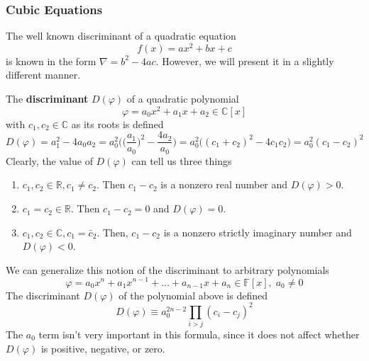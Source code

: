     \subsubsection{Cubic Equations}

      The well known discriminant of a quadratic equation 
      \begin{equation}
        f(x) = ax^2 + bx + c
      \end{equation}
      is known in the form $\nabla = b^2 - 4ac$. However, we will present it in a slightly different manner. 

      \begin{definition}
        The \textbf{discriminant} $D(\varphi)$ of a quadratic polynomial
        \begin{equation}
          \varphi = a_0 x^2 + a_1 x + a_2 \in \mathbb{C}[x]
        \end{equation}
        with $c_1, c_2 \in \mathbb{C}$ as its roots is defined
        \begin{equation}
          D(\varphi) = a_1^2 - 4 a_0 a_2 = a_0^2 \bigg( \Big(\frac{a_1}{a_0} \Big)^2 - \frac{4 a_2}{a_0} \bigg) = a_0^2 \big( (c_1 + c_2)^2 - 4 c_1 c_2 \big) = a_0^2 (c_1 - c_2)^2
        \end{equation}
        Clearly, the value of $D(\varphi)$ can tell us three things
        \begin{enumerate}
          \item $c_1, c_2 \in \mathbb{R}, c_1 \neq c_2$. Then $c_1 - c_2$ is a nonzero real number and $D(\varphi) > 0$. 
          \item $c_1 = c_2 \in \mathbb{R}$. Then $c_1 - c_2 = 0$ and $D(\varphi) = 0$. 
          \item $c_1, c_2 \in \mathbb{C}, c_1 = \bar{c}_2$. Then, $c_1 - c_2$ is a nonzero strictly imaginary number and $D(\varphi) < 0$. 
        \end{enumerate}
      \end{definition}

      \begin{definition}
        We can generalize this notion of the discriminant to arbitrary polynomials
        \begin{equation}
          \varphi = a_0 x^n + a_1 x^{n-1} + ... + a_{n-1} x + a_n \in \mathbb{F}[x], \; a_0 \neq 0
        \end{equation}
        The discriminant $D(\varphi)$ of the polynomial above is defined
        \begin{equation}
          D(\varphi) \equiv a_0^{2n-2} \prod_{i>j} (c_i - c_j)^2
        \end{equation}
        The $a_0$ term isn't very important in this formula, since it does not affect whether $D(\varphi)$ is positive, negative, or zero. 
      \end{definition}

